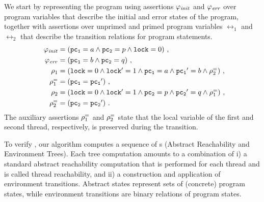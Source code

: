 We start by representing the program using assertions $\varphi_{\mathit{init}}$ and
$\varphi_{\mathit{err}}$ over program variables that describe the initial and
error states of the program, together with assertions over unprimed
and primed program variables $\rel_1$ and $\rel_2$ that describe the
transition relations for program statements.
%
\begin{equation*}
  \begin{array}[t]{r@{}l@{}}
    \SymbInit = (&\pcone=a \land \pctwo=p \land \lock=0)\ , \\[\jot]
    \SymbError = (&\pcone=b \land \pctwo=q)\ ,\\[\jot]
    \rel_1 = (&\lock=0 \land \lock'=1 \land \pcone=a \land
    \pcone'=b \land  \relLocEqOf{2})\ ,
    \\[\jot]
    \relLocEqOf{1} = (&\pcone=\pcone')\ , \\[\jot]
    \rel_2 = (&\lock=0 \land \lock'=1 \land \pctwo=p \land \pctwo'=q
    \land \relLocEqOf{1})\ , \\[\jot]
    \relLocEqOf{2} = (&\pctwo=\pctwo')\ .
 \end{array}
\end{equation*} 
%
The auxiliary assertions $\rho^=_{1}$ and $\rho^=_{2}$ state
that the local variable of the first and second thread, respectively,
is preserved during the transition.

\iffalse
The transition relations $\rel_1$ and $\rel_2$ refer to all program
variables, i.e., the global variable $\lock$ as well as the local
variables $\pcone$ and $\pctwo\ $.

For example, the transition relation $\rel_1$ of the first thread
requires that the local variable of the second thread does not change,
which is expressed by the conjunct $\pctwo = \pctwo'$ in~$\rel_1\ $.
\fi

To verify \TakeLockBit, our algorithm computes a sequence of \aret{}s
(Abstract Reachability and Environment Trees).
Each tree computation amounts to a combination of i) a standard
abstract reachability computation that is performed for each thread
and is called thread reachability, and ii) a construction and
application of environment transitions.
Abstract states represent sets of (concrete) program states, while
environment transitions are binary relations of program states.

